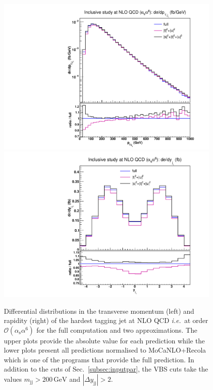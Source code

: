 \documentclass[twocolumn,epjc3]{svjour3} %
\newcommand{\Pj}{\ensuremath{\text{j}}\xspace}
\newcommand{\GeV}{\ensuremath{\,\text{GeV}}\xspace}
\newcommand{\alphas}{\ensuremath{\alpha_\text{s}}\xspace}
\begin{document}
    \begin{figure}
    \centering
    {\includegraphics[scale=0.35]{figures/scanfigures/ptj1_nlo.pdf}}
    {\includegraphics[scale=0.35]{figures/scanfigures/yj1_nlo.pdf}}
    \caption{Differential distributions in the transverse momentum (left) and rapidity (right) of the hardest tagging jet at NLO QCD \emph{i.e.}\ at order $\mathcal{O}(\alphas\alpha^6)$ for the full computation and two approximations.
    The upper plots provide the absolute value for each prediction while the lower plots present all predictions normalised to {\sc MoCaNLO}+{\sc Recola} which is one of the programs that provide the full prediction.
    In addition to the cuts of Sec.~\protect\ref{subsec:inputpar}, the VBS cuts take the values $m_{\Pj\Pj}>200 \GeV$ and $|\Delta y_{\Pj\Pj}|>2$.} 
    \label{fig:mjjdyjj_1d_2}
    \end{figure}
\end{document}
